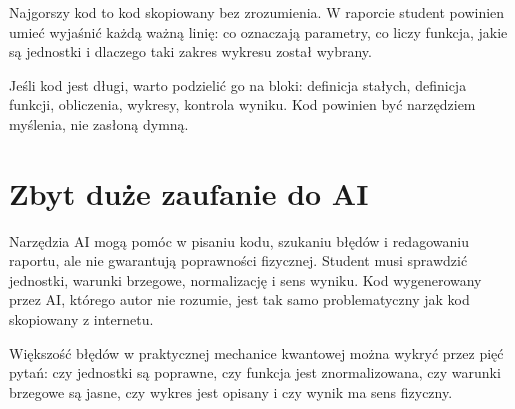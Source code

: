 Najgorszy kod to kod skopiowany bez zrozumienia. W raporcie student powinien umieć
wyjaśnić każdą ważną linię: co oznaczają parametry, co liczy funkcja, jakie są
jednostki i dlaczego taki zakres wykresu został wybrany.

Jeśli kod jest długi, warto podzielić go na bloki: definicja stałych, definicja
funkcji, obliczenia, wykresy, kontrola wyniku. Kod powinien być narzędziem
myślenia, nie zasłoną dymną.

\section{Zbyt duże zaufanie do AI}

Narzędzia AI mogą pomóc w pisaniu kodu, szukaniu błędów i redagowaniu raportu,
ale nie gwarantują poprawności fizycznej. Student musi sprawdzić jednostki,
warunki brzegowe, normalizację i sens wyniku. Kod wygenerowany przez AI, którego
autor nie rozumie, jest tak samo problematyczny jak kod skopiowany z internetu.

\begin{summarybox}
Większość błędów w praktycznej mechanice kwantowej można wykryć przez pięć pytań:
czy jednostki są poprawne, czy funkcja jest znormalizowana, czy warunki brzegowe
są jasne, czy wykres jest opisany i czy wynik ma sens fizyczny.
\end{summarybox}
